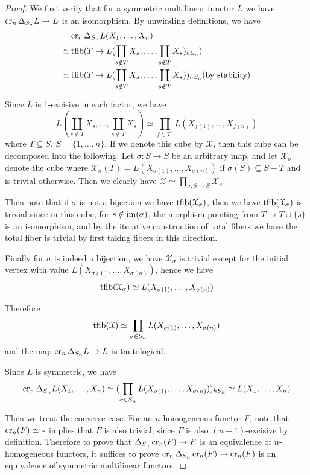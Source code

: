 	\begin{proof}
		We first verify that for a symmetric multilinear functor $L$ we have $\operatorname{\mathrm{cr}}_n\Delta_{S_n}L\to L$ is an isomorphism. By unwinding definitions, we have
		\begin{align*}
			&\operatorname{\mathrm{cr}}_n\Delta_{S_n}L(X_1,\dots,X_n) \\
			\simeq&\operatorname{\mathrm{tfib}}(T\mapsto L(\coprod_{s\notin T}X_s,\dots,\coprod_{s\notin T}X_s)_{hS_n}) \\
			\simeq&\operatorname{\mathrm{tfib}}(T\mapsto L(\coprod_{s\notin T}X_s,\dots,\coprod_{s\notin T}X_s))_{hS_n} (\text{by~stability})
		\end{align*}

		Since $L$ is 1-excisive in each factor, we have 
		\[ L(\coprod_{s\notin T}X_s,\dots,\coprod_{s\notin T}X_s)\simeq\prod_{f\in T^n}L(X_{f(1)},\dots,X_{f(n)}) \]
		where $T\subseteq S$, $S=\{1,\dots,n\}$. If we denote this cube by $\mathcal{X}$, then this cube can be decomposed into the following. Let $\sigma:S\to S$ be an arbitrary map, and let $\mathcal{X}_\sigma$ denote the cube where $\mathcal{X}_\sigma(T)=L(X_{\sigma(1)},\dots,X_{\sigma(n)})$ if $\sigma(S)\subseteq S-T$ and is trivial otherwise. Then we clearly have $\mathcal{X}\simeq\prod_{\sigma:S\to S}\mathcal{X}_{\sigma}$. 

		Then note that if $\sigma$ is not a bijection we have $\operatorname{\mathrm{tfib}}(\mathcal{X}_\sigma)$, then we have $\operatorname{\mathrm{tfib}}(\mathcal{X}_\sigma)$ is trivial since in this cube, for $s\notin\operatorname{\mathrm{im}}(\sigma)$, the morphism pointing from $T\to T\cup\{s\}$ is an isomorphism, and by the iterative construction of total fibers we have the total fiber is trivial by first taking fibers in this direction. 

		Finally for $\sigma$ is indeed a bijection, we have $\mathcal{X}_{\sigma}$ is trivial except for the initial vertex with value $L(X_{\sigma(1)},\dots,X_{\sigma(n)})$, hence we have 
		\[ \operatorname{\mathrm{tfib}}(\mathcal{X}_\sigma)\simeq L(X_{\sigma(1)},\dots,X_{\sigma(n)}) \]

		Therefore 
		\[ \operatorname{\mathrm{tfib}}(\mathcal{X})\simeq\prod_{\sigma\in S_n}L(X_{\sigma(1)},\dots,X_{\sigma(n)}) \]
		and the map $\operatorname{\mathrm{cr}}_n\Delta_{S_n}L\to L$ is tautological. 

		Since $L$ is symmetric, we have 
		\[ \operatorname{\mathrm{cr}}_n\Delta_{S_n}L(X_1,\dots,X_n)\simeq(\prod_{\sigma\in S_n}L(X_{\sigma(1)},\dots,X_{\sigma(n)}))_{hS_n}\simeq L(X_1,\dots,X_n) \]

		Then we treat the converse case. For an $n$-homogeneous functor $F$, note that $\operatorname{\mathrm{cr}}_n(F)\simeq*$ implies that $F$ is also trivial, since $F$ is also $(n-1)$-excisive by definition. Therefore to prove that $\Delta_{S_n}\operatorname{\mathrm{cr}}_n(F)\to F$ is an equivalence of $n$-homogeneous functors, it suffices to prove $\operatorname{\mathrm{cr}}_n\Delta_{S_n}\operatorname{\mathrm{cr}}_n(F)\to\operatorname{\mathrm{cr}}_n(F)$ is an equivalence of symmetric multilinear functors. 


\end{proof}
